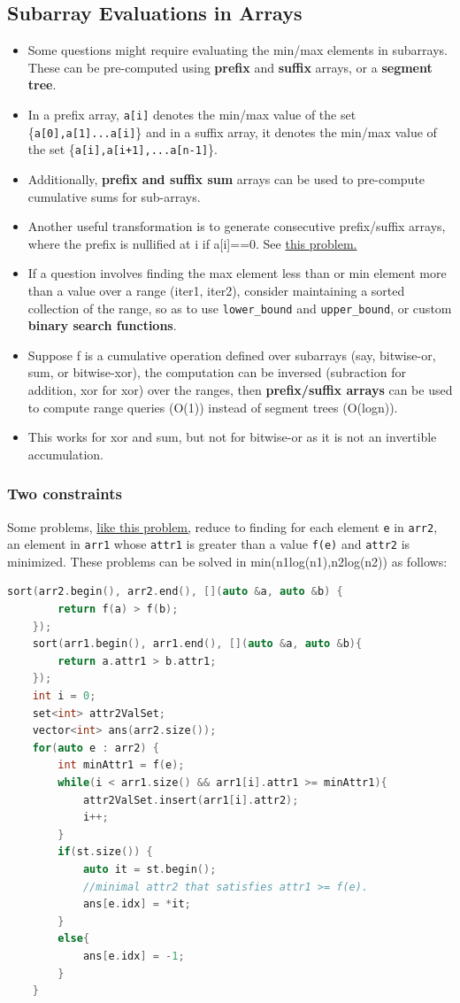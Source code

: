 \documentclass{report}
\begin{document}
\subsection{Subarray Evaluations in Arrays}
\begin{itemize}
\item Some questions might require evaluating the min/max elements in subarrays. These can be pre-computed using
\textbf{prefix} and \textbf{suffix} arrays, or a \textbf{segment tree}.
\item  In a prefix array, \texttt{a[i]} denotes the min/max value
of the set \{\texttt{a[0],a[1]...a[i]}\} and in a suffix array, it denotes the min/max value
of the set \{\texttt{a[i],a[i+1],...a[n-1]}\}.
\item Additionally, \textbf{prefix and suffix sum} arrays
can be used to pre-compute cumulative sums for sub-arrays.
\item Another useful transformation is to generate consecutive prefix/suffix arrays, where the prefix is nullified 
at i if a[i]==0. See \href{https://leetcode.com/problems/maximal-rectangle/description/}{this problem.}
\item If a question involves finding
the max element less than or min element more than a value over a range (iter1, iter2), consider maintaining 
a sorted collection of the range, so as to use \texttt{lower\_bound} and \texttt{upper\_bound}, or custom \textbf{binary search functions}.
\item Suppose f is a cumulative operation defined over subarrays (say, bitwise-or, sum, or bitwise-xor), the computation can be inversed (subraction for addition, xor for xor) over the ranges, then \textbf{prefix/suffix arrays} can be used to compute
range queries (O(1)) instead of segment trees (O(logn)).
\item This works for xor and sum, but not for bitwise-or as it is not an invertible accumulation. 
\end{itemize}
\subsubsection{Two constraints}
Some problems, \href{https://leetcode.com/problems/closest-room/}{like this problem,} reduce to finding for each element \texttt{e} in \texttt{arr2}, an 
element in \texttt{arr1} whose \texttt{attr1} is greater than a value \texttt{f(e)} 
and \texttt{attr2} is minimized. These problems can be solved in min(n1log(n1),n2log(n2)) as follows:
\begin{lstlisting}[caption=Two constraints, language=C++]
    sort(arr2.begin(), arr2.end(), [](auto &a, auto &b) {
        return f(a) > f(b);
    });
    sort(arr1.begin(), arr1.end(), [](auto &a, auto &b){
        return a.attr1 > b.attr1;
    });
    int i = 0;
    set<int> attr2ValSet;
    vector<int> ans(arr2.size());
    for(auto e : arr2) {
        int minAttr1 = f(e);
        while(i < arr1.size() && arr1[i].attr1 >= minAttr1){
            attr2ValSet.insert(arr1[i].attr2);
            i++;
        }
        if(st.size()) {
            auto it = st.begin();
            //minimal attr2 that satisfies attr1 >= f(e).
            ans[e.idx] = *it;
        }
        else{
            ans[e.idx] = -1;
        }
    }
\end{lstlisting}
\end{document}
